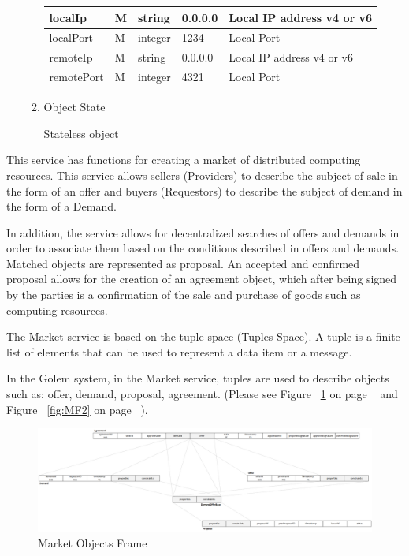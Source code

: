 \begin{enumerate}
\begin{enumerate}
\begin{center}
\begin{tabular}{|p{3cm}|l|p{3cm}|p{3cm}|p{4cm}|}
localIp 		& M & string  & 0.0.0.0	& Local IP address v4 or v6 \\
\hline

localPort 		& M & integer & 1234	& Local Port \\
\hline 

remoteIp 		& M & string  & 0.0.0.0	& Local IP address v4 or v6 \\
\hline

remotePort 		& M & integer & 4321	& Local Port \\
\hline 

\end{tabular}
\end{center}

\item Object State

Stateless object

\end{enumerate}


\end{enumerate}

\break


This service has functions for creating a market of distributed computing resources.
This service allows sellers (Providers) to describe the subject of sale in the form of an offer
and buyers (Requestors) to describe the subject of demand in the form of a Demand.

In addition, the service allows for decentralized searches of offers and demands in order to associate them
based on the conditions described in offers and demands. Matched objects are represented as
proposal. An accepted and confirmed proposal allows for the creation of an agreement object, which
after being signed by the parties is a confirmation of the sale and purchase of goods such as computing resources.

The Market service is based on the tuple space (Tuples Space).
A tuple is a finite list of elements that can be used to represent a data item or a message.

In the Golem system, in the Market service, tuples are used to describe objects such as:
offer, demand, proposal, agreement. (Please see Figure ~\ref{fig:MF1} on page ~\pageref{fig:MF1}
and Figure ~\ref{fig:MF2} on page ~\pageref{fig:MF2}).

\begin{figure}[htbp]
    \centering
    \includegraphics[width=14cm,angle=0]{./diag/Reference/MarketFrame-1-Reference.png}
	\caption{Market Objects Frame}
    \label{fig:MF1}
\end{figure}


